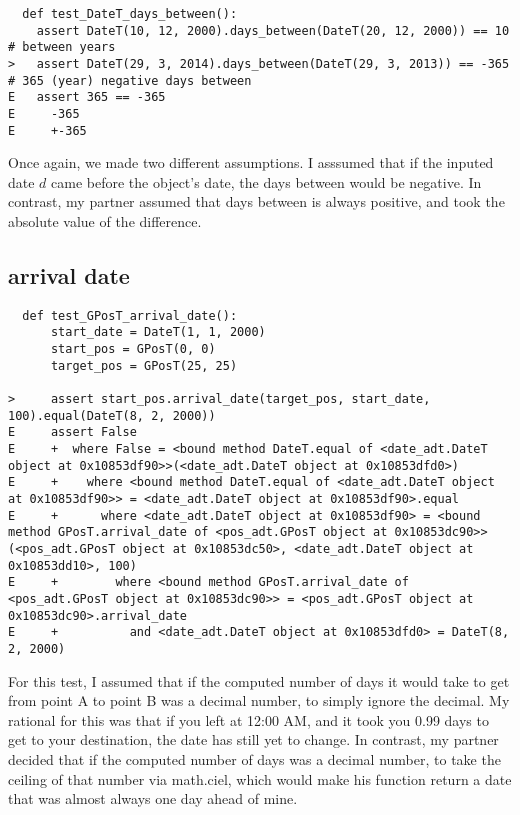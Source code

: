 \documentclass[12pt]{article}
\begin{document}
\begin{lstlisting}
  def test_DateT_days_between():
    assert DateT(10, 12, 2000).days_between(DateT(20, 12, 2000)) == 10 # between years
>   assert DateT(29, 3, 2014).days_between(DateT(29, 3, 2013)) == -365 # 365 (year) negative days between
E   assert 365 == -365
E     -365
E     +-365
\end{lstlisting}

Once again, we made two different assumptions. I asssumed that if the inputed date $d$ came before the object's date, the days between would be negative. In contrast, my partner assumed that days between is always positive, and took the absolute value of the difference.
\\

\subsection{arrival date}

\begin{lstlisting}
  def test_GPosT_arrival_date():
      start_date = DateT(1, 1, 2000)
      start_pos = GPosT(0, 0)
      target_pos = GPosT(25, 25)

>     assert start_pos.arrival_date(target_pos, start_date, 100).equal(DateT(8, 2, 2000))
E     assert False
E     +  where False = <bound method DateT.equal of <date_adt.DateT object at 0x10853df90>>(<date_adt.DateT object at 0x10853dfd0>)
E     +    where <bound method DateT.equal of <date_adt.DateT object at 0x10853df90>> = <date_adt.DateT object at 0x10853df90>.equal
E     +      where <date_adt.DateT object at 0x10853df90> = <bound method GPosT.arrival_date of <pos_adt.GPosT object at 0x10853dc90>>(<pos_adt.GPosT object at 0x10853dc50>, <date_adt.DateT object at 0x10853dd10>, 100)
E     +        where <bound method GPosT.arrival_date of <pos_adt.GPosT object at 0x10853dc90>> = <pos_adt.GPosT object at 0x10853dc90>.arrival_date
E     +          and <date_adt.DateT object at 0x10853dfd0> = DateT(8, 2, 2000)
\end{lstlisting}

For this test, I assumed that if the computed number of days it would take to get from point A to point B was a decimal number, to simply ignore the decimal. My rational for this was that if you left at 12:00 AM, and it took you 0.99 days to get to your destination, the date has still yet to change. In contrast, my partner decided that if the computed number of days was a decimal number, to take the ceiling of that number via math.ciel, which would make his function return a date that was almost always one day ahead of mine.
\\
\end{document}
